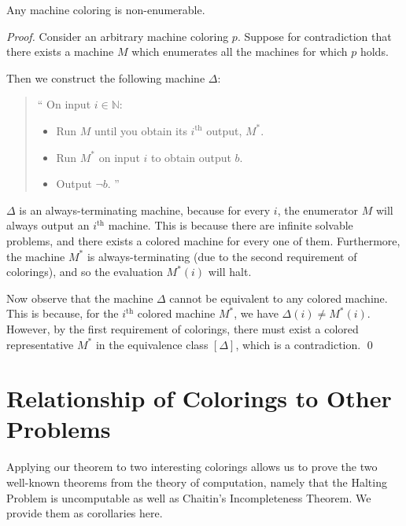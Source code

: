 \documentclass[runningheads]{format/llncs}
\begin{document}
\begin{theorem}\label{thm:color}
    Any machine coloring is non-enumerable.
\end{theorem}
\begin{proof}
    Consider an arbitrary machine coloring $p$. Suppose for
    contradiction that there exists a machine $M$ which enumerates
    all the machines for which $p$ holds.

    Then we construct the following machine $\Delta$:

    \begin{quote}
        `` On input $i \in \mathbb{N}$:
        \begin{itemize}
            \item Run $M$ until you obtain its $i^\text{th}$ output, $M^*$.
            \item Run $M^*$ on input $i$ to obtain output $b$.
            \item Output $\lnot b$. ''
        \end{itemize}
    \end{quote}

    $\Delta$ is an always-terminating machine, because for every $i$, the
    enumerator $M$ will always output an $i^\text{th}$ machine.
    This is because there are infinite solvable problems, and
    there exists a colored machine for every one of them.
    Furthermore, the machine $M^*$ is always-terminating (due to the
    second requirement of colorings), and so
    the evaluation $M^*(i)$ will halt.

    Now observe that the machine $\Delta$ cannot be equivalent to any colored
    machine. This is because,
    for the $i^\text{th}$ colored machine $M^*$, we have
    $\Delta(i) \neq M^*(i)$. However, by the first requirement of colorings,
    there must exist a colored representative
    $M^*$ in the equivalence class $[\Delta]$, which is a contradiction.
    \qed
\end{proof}

\section{Relationship of Colorings to Other Problems}

Applying our theorem to two interesting colorings allows us to prove
the two well-known theorems from the theory of computation, namely
that the Halting Problem is uncomputable as well as Chaitin's Incompleteness
Theorem. We provide them as corollaries here.
\end{document}
